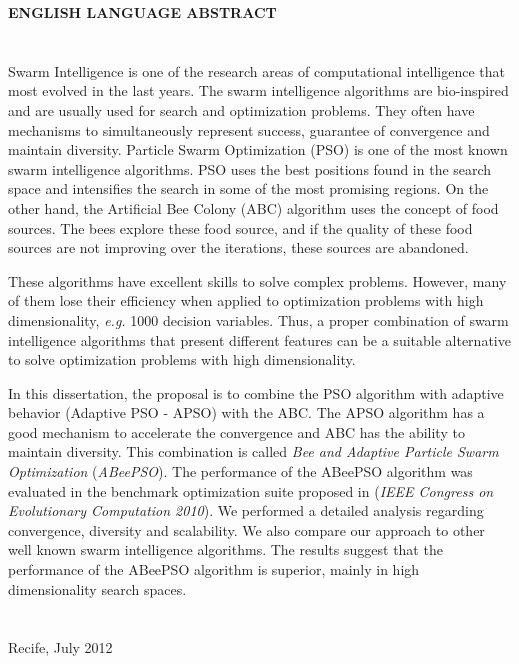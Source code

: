 \begin{flushbottom}
\textbf{ENGLISH LANGUAGE ABSTRACT}
\\
\\
\\
Swarm Intelligence is one of the research areas of computational intelligence that most evolved in the last years. The swarm intelligence algorithms are bio-inspired and are usually used for search and optimization problems. They often have mechanisms to simultaneously represent success, guarantee of convergence and maintain diversity. Particle Swarm Optimization (PSO) is one of the most known swarm intelligence algorithms. PSO uses the best positions found in the search space and intensifies the search in some of the most promising regions. On the other hand, the Artificial Bee Colony (ABC) algorithm uses the concept of food sources. The bees explore these food source, and if the quality of these food sources are not improving over the iterations, these sources are abandoned.

These algorithms have excellent skills to solve complex problems. However, many of them lose their efficiency when applied to optimization problems with high dimensionality, \textit{e.g.} 1000 decision variables. Thus, a proper combination of swarm intelligence algorithms that present different features can be a suitable alternative to solve optimization problems with high dimensionality.

In this dissertation, the proposal is to combine the PSO algorithm with adaptive behavior (Adaptive PSO - APSO) with the ABC. The APSO algorithm has a good mechanism to accelerate the convergence and ABC has the ability to maintain diversity. This combination is called \emph{Bee and Adaptive Particle Swarm Optimization} (\emph{ABeePSO}). The performance of the ABeePSO algorithm was evaluated in the benchmark optimization suite proposed in (\textit{IEEE Congress on Evolutionary Computation 2010}). We performed a detailed analysis regarding convergence, diversity and scalability. We also compare our approach to other well known swarm intelligence algorithms. The results suggest that the performance of the ABeePSO algorithm is superior, mainly in high dimensionality search spaces.
\\
\\
\\  Recife, July 2012
\end{flushbottom}
\newpage
